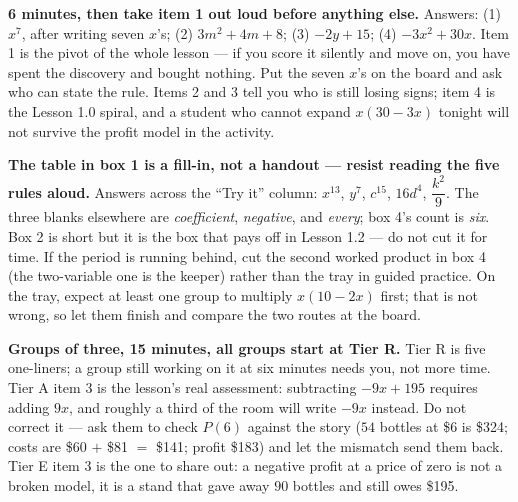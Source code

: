 \documentclass[10pt]{article}
\begin{document}
\begin{teachernote}[Warm-Up]
    \textbf{6 minutes, then take item 1 out loud before anything else.} Answers: (1) $x^7$, after
    writing seven $x$'s; (2) $3m^2+4m+8$; (3) $-2y+15$; (4) $-3x^2+30x$. Item 1 is the pivot of
    the whole lesson --- if you score it silently and move on, you have spent the discovery and
    bought nothing. Put the seven $x$'s on the board and ask who can state the rule. Items 2 and 3
    tell you who is still losing signs; item 4 is the Lesson 1.0 spiral, and a student who cannot
    expand $x(30-3x)$ tonight will not survive the profit model in the activity.
\end{teachernote}

\begin{teachernote}
    \textbf{The table in box 1 is a fill-in, not a handout --- resist reading the five rules
    aloud.} Answers across the ``Try it'' column: $x^{13}$, $y^7$, $c^{15}$, $16d^4$,
    $\dfrac{k^2}{9}$. The three blanks elsewhere are \emph{coefficient}, \emph{negative}, and
    \emph{every}; box 4's count is \emph{six}. Box 2 is short but it is the box that pays off in
    Lesson 1.2 --- do not cut it for time. If the period is running behind, cut the second worked
    product in box 4 (the two-variable one is the keeper) rather than the tray in guided practice.
    On the tray, expect at least one group to multiply $x(10-2x)$ first; that is not wrong, so let
    them finish and compare the two routes at the board.
\end{teachernote}

\begin{teachernote}
    \textbf{Groups of three, 15 minutes, all groups start at Tier R.} Tier R is five one-liners;
    a group still working on it at six minutes needs you, not more time. Tier A item 3 is the
    lesson's real assessment: subtracting $-9x+195$ requires adding $9x$, and roughly a third of
    the room will write $-9x$ instead. Do not correct it --- ask them to check $P(6)$ against the
    story ($54$ bottles at \$6 is \$324; costs are \$60 $+$ \$81 $=$ \$141; profit \$183) and let
    the mismatch send them back. Tier E item 3 is the one to share out: a negative profit at a
    price of zero is not a broken model, it is a stand that gave away $90$ bottles and still owes
    \$195.
\end{teachernote}
\end{document}

